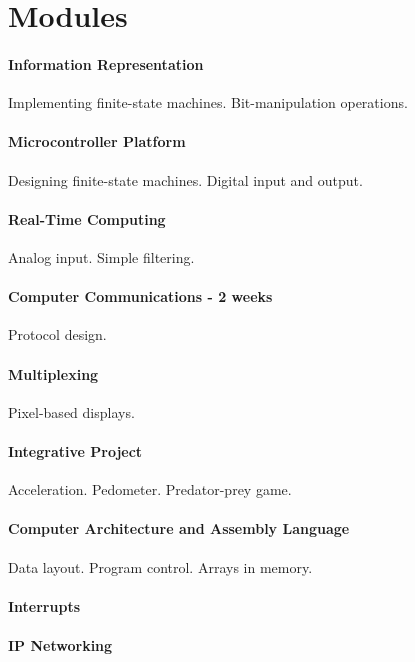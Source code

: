 \section{Modules}
\label{sec:weeks}


\paragraph{Information Representation} Implementing finite-state machines.
Bit-manipulation operations.

\paragraph{Microcontroller Platform} Designing finite-state machines.
Digital input and output.

\paragraph{Real-Time Computing} Analog input. Simple filtering.

\paragraph{Computer Communications - 2 weeks} Protocol design.

\paragraph{Multiplexing} Pixel-based displays.

\paragraph{Integrative Project} Acceleration. Pedometer. Predator-prey game.

\paragraph{Computer Architecture and Assembly Language} Data layout.
Program control. Arrays in memory.


\paragraph{Interrupts}

\paragraph{IP Networking}
